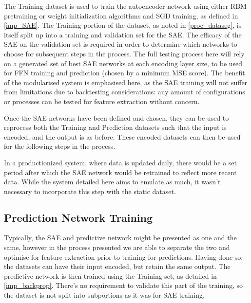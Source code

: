 \documentclass[a4paper,11pt,oneside]{article}
\theoremstyle{plain}
\theoremstyle{definition}
\begin{document}
The Training dataset is used to train the autoencoder network using either RBM pretraining or weight initialization algorithms and SGD training, as defined in \ref{imp_SAE}. The Training portion of the dataset, as noted in \ref{proc_dataseg}, is itself split up into a training and validation set for the SAE. The efficacy of the SAE on the validation set is required in order to determine which networks to choose for subsequent steps in the process. The full testing process here will rely on a generated set of best SAE networks at each encoding layer size, to be used for FFN training and prediction (chosen by a minimum MSE score). The benefit of the modularised system is emphasised here, as the SAE training will not suffer from limitations due to backtesting considerations: any amount of configurations or processes can be tested for feature extraction without concern. \newline

Once the SAE networks have been defined and chosen, they can be used to reprocess both the Training and Prediction datasets such that the input is encoded, and the output is as before. These encoded datasets can then be used for the following steps in the process. \newline

In a productionized system, where data is updated daily, there would be a set period after which the SAE network would be retrained to reflect more recent data. While the system detailed here aims to emulate as much, it wasn't necessary to incorporate this step with the static dataset. \newline

\subsection{Prediction Network Training}\label{proc_predictionnetwork}

Typically, the SAE and predictive network might be presented as one and the same, however in the process presented we are able to separate the two and optimise for feature extraction prior to training for predictions. Having done so, the datasets can have their input encoded, but retain the same output. The predictive network is then trained using the Training set, as detailed in \ref{imp_backprop}. There's no requirement to validate this part of the training, so the dataset is not split into subportions as it was for SAE training. \newline
\end{document}
